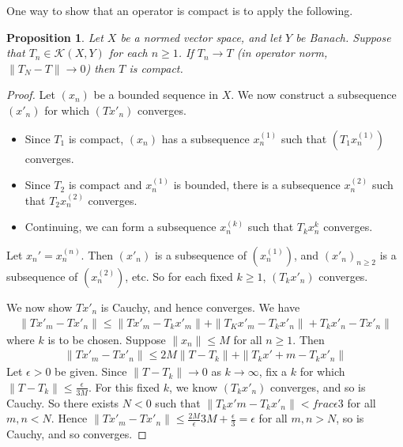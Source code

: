 \documentclass[justified]{tufte-book}
\theoremstyle{plain}%
\newtheorem{prop}[thm]{Proposition}
\theoremstyle{definition}
\theoremstyle{remark}
\begin{document}
One way to show that an operator is compact is to apply the following.  
\begin{prop}
  Let $X$ be a normed vector space, and let $Y$ be Banach.  Suppose that $T_n \in \mathcal K(X, Y)$ for each $n \geq 1$.  If $T_n \rightarrow T$ (in operator norm, $\| T_N - T \| \rightarrow 0$) then $T$ is compact.  
\end{prop}
\begin{proof}
  Let $(x_n)$ be a bounded sequence in $X$.  We now construct a subsequence $(x'_n)$ for which $(Tx'_n)$ converges.  \begin{itemize}
      \item Since $T_1$ is compact, $(x_n)$ has a subsequence $x^{(1)}_n$ such that $(T_1 x^{(1)}_n)$ converges. 
      \item Since $T_2$ is compact and $x^{(1)}_n$ is bounded, there is a subsequence $x_n^{(2)}$ such that $T_2 x^{(2)}_n$ converges. 
      \item Continuing, we can form a subsequence $x^{(k)}_n$ such that $T_k x^{k}_n$ converges. 
  \end{itemize}

Let $x_n' = x_n^{(n)}$.  Then $(x'_n)$ is a subsequence of $(x_n^{(1)})$, and $(x'_n)_{n \geq 2}$ is a subsequence of $(x_n^{(2)})$, etc.  So for each fixed $k \geq 1$, $(T_k x'_n)$ converges.  

We now show $T x'_n$ is Cauchy, and hence converges.  We have \begin{align*}
  \| Tx'_m - T x'_n \| \leq \| T x'_m - T_k x'_m \| + \| T_K x'_m - T_k x'_n \| + T_k x'_n - T x'_n \|
\end{align*} where $k$ is to be chosen.  Suppose $\| x_n \| \leq M$ for all $n \geq 1$.  Then \begin{align*}
  \| Tx'_m - T x'_n \| \leq 2 M \| T - T_k \| + \| T_k x'+m - T_k x'_n \|
\end{align*} Let $\epsilon > 0$ be given. Since $\| T - T_k \| \rightarrow 0$ as $ k \rightarrow \infty$, fix a $k$ for which $\| T - T_k \| \leq \frac{\epsilon}{3M}$.  For this fixed $k$, we know $(T_k x'_n)$ converges, and so is Cauchy.  So there exists $N < 0$ such that $\| T_k x'm - T_k x'_n\| < frac{\epsilon}{3}$ for all $m,n < N$.  Hence $\|T x'_m - Tx'_n \| \leq \frac{2M}{\epsilon}{3M} + \frac{\epsilon}{3} = \epsilon$ for all $m , n > N$, so is Cauchy, and so converges. 
\end{proof}
\end{document}
